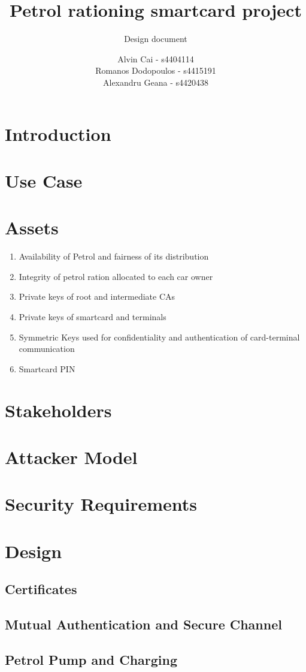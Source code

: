 \documentclass[a4paper,10pt]{llncs}
\title{Petrol rationing smartcard project}
\subtitle{Design document}
\author{Alvin Cai - s4404114 \\ Romanos Dodopoulos - s4415191 \\ Alexandru Geana - s4420438}
\institute{}
\begin{document}
\maketitle

\section{Introduction}


\section{Use Case}


\section{Assets}

\begin{enumerate}
  \item Availability of Petrol and fairness of its distribution
  \item Integrity of petrol ration allocated to each car owner
  \item Private keys of root and intermediate CAs
  \item Private keys of smartcard and terminals
  \item Symmetric Keys used for confidentiality and authentication of card-terminal communication
  \item Smartcard PIN 
\end{enumerate}

\section{Stakeholders}



\section{Attacker Model}


\section{Security Requirements}



\section{Design}
\subsection{Certificates}

\subsection{Mutual Authentication and Secure Channel}

\subsection{Petrol Pump and Charging}
\end{document}
